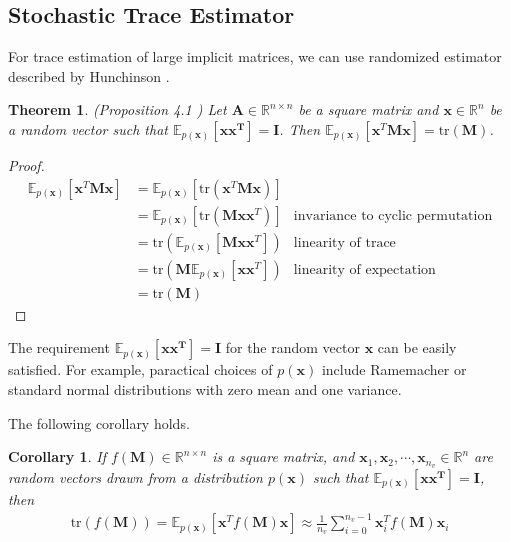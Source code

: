 \documentclass[senior,final,11pt]{iscs-thesis}
\newtheorem{theorem}{Theorem}
\newtheorem{corollary}{Corollary}[theorem]
\begin{document}
\subsection{Stochastic Trace Estimator} \label{STE}
For trace estimation of large implicit matrices, we can use randomized estimator described by Hunchinson \cite{hutchinson1989stochastic, adams2018estimating}.
\begin{theorem}
    \label{Hunchinson}
    (Proposition 4.1 \cite{adams2018estimating}) Let ${\mathbf A} \in \mathbb{R}^{n\times n}$ be a square matrix and $\mathbf{x} \in \mathbb{R}^n$ be a random vector such that $\mathbb{E}_{p(\mathbf{x})}[\mathbf{xx^T}] = \mathbf{I}$. Then $\mathbb{E}_{p(\mathbf{x})}[\mathbf{x}^{T}\mathbf{M}\mathbf{x}] = \mathrm{tr}(\mathbf{M})$.
\end{theorem}

\begin{proof}
    \begin{align*}
        \mathbb{E}_{p(\mathbf{x})}[\mathbf{x}^{T}\mathbf{M}\mathbf{x}] &= \mathbb{E}_{p(\mathbf{x})}[\mathrm{tr}(\mathbf{x}^{T}\mathbf{M}\mathbf{x})] \\
          &=  \mathbb{E}_{p(\mathbf{x})}[\mathrm{tr}(\mathbf{M}\mathbf{x}\mathbf{x}^{T})]  &\text{invariance to cyclic permutation} \\
          &= \mathrm{tr}(\mathbb{E}_{p(\mathbf{x})}[\mathbf{M}\mathbf{x}\mathbf{x}^{T}] ) &\text{linearity of trace}  \\
          &= \mathrm{tr}(\mathbf{M}\mathbb{E}_{p(\mathbf{x})}[\mathbf{x}\mathbf{x}^{T}] ) &\text{linearity of expectation}  \\
          &= \mathrm{tr}(\mathbf{M})
    \end{align*}
\end{proof}

The requirement $\mathbb{E}_{p(\mathbf{x})}[\mathbf{xx^T}] = \mathbf{I}$ for the random vector  $\mathbf{x}$ can be easily satisfied. For example, paractical choices of $p(\mathbf{x})$ include Ramemacher or standard normal distributions with zero mean and one variance.

The following corollary holds.

\begin{corollary}
    \label{approxtrace}
    If $f(\mathbf{M}) \in \mathbb{R}^{n\times n}$ is a square matrix, and $\mathbf{x}_1, \mathbf{x}_2, \cdots, \mathbf{x}_{n_v} \in \mathbb{R}^n$ are random vectors drawn from a distribution $p(\mathbf{x})$ such that $\mathbb{E}_{p(\mathbf{x})}[\mathbf{xx^T}] = \mathbf{I}$, then
    \begin{align*}
        \mathrm{tr}(f(\mathbf{M})) =\mathbb{E}_{p(\mathbf{x})}[\mathbf{x}^{T}f(\mathbf{M})\mathbf{x}] \approx \frac{1}{n_v}\sum_{i=0}^{n_v-1} \mathbf{x}_i^{T}f(\mathbf{M})\mathbf{x}_i
    \end{align*}
\end{corollary}
\end{document}
